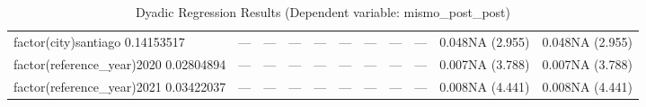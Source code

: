 \begin{table}[ht]
\begin{tabular}{lllllllllll}
  factor(city)santiago 0.14153517 & --- & --- & --- & --- & --- & --- & --- & --- & 0.048NA (2.955) & 0.048NA (2.955) \\ 
  factor(reference\_year)2020 0.02804894 & --- & --- & --- & --- & --- & --- & --- & --- & 0.007NA (3.788) & 0.007NA (3.788) \\ 
  factor(reference\_year)2021 0.03422037 & --- & --- & --- & --- & --- & --- & --- & --- & 0.008NA (4.441) & 0.008NA (4.441) \\ 
   \hline
\end{tabular}
\caption{Dyadic Regression Results (Dependent variable: mismo\_post\_post)} 
\label{tab:dyadic_models}
\end{table}
